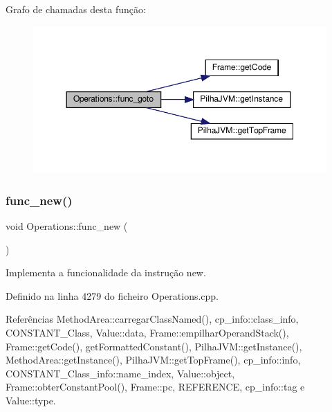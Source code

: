 Grafo de chamadas desta função\+:\nopagebreak
\begin{figure}[H]
\begin{center}
\leavevmode
\includegraphics[width=350pt]{classOperations_aa4ae9d3899f61ee20ec278152891fe9e_cgraph}
\end{center}
\end{figure}
\mbox{\label{classOperations_a7594e147407e1f4ede57229899fd17d6}} 
\subsubsection{\texorpdfstring{func\+\_\+new()}{func\_new()}}
{\footnotesize\ttfamily void Operations\+::func\+\_\+new (\begin{DoxyParamCaption}{ }\end{DoxyParamCaption})\hspace{0.3cm}{\ttfamily [private]}}



Implementa a funcionalidade da instrução new. 



Definido na linha 4279 do ficheiro Operations.\+cpp.



Referências Method\+Area\+::carregar\+Class\+Named(), cp\+\_\+info\+::class\+\_\+info, C\+O\+N\+S\+T\+A\+N\+T\+\_\+\+Class, Value\+::data, Frame\+::empilhar\+Operand\+Stack(), Frame\+::get\+Code(), get\+Formatted\+Constant(), Pilha\+J\+V\+M\+::get\+Instance(), Method\+Area\+::get\+Instance(), Pilha\+J\+V\+M\+::get\+Top\+Frame(), cp\+\_\+info\+::info, C\+O\+N\+S\+T\+A\+N\+T\+\_\+\+Class\+\_\+info\+::name\+\_\+index, Value\+::object, Frame\+::obter\+Constant\+Pool(), Frame\+::pc, R\+E\+F\+E\+R\+E\+N\+CE, cp\+\_\+info\+::tag e Value\+::type.




